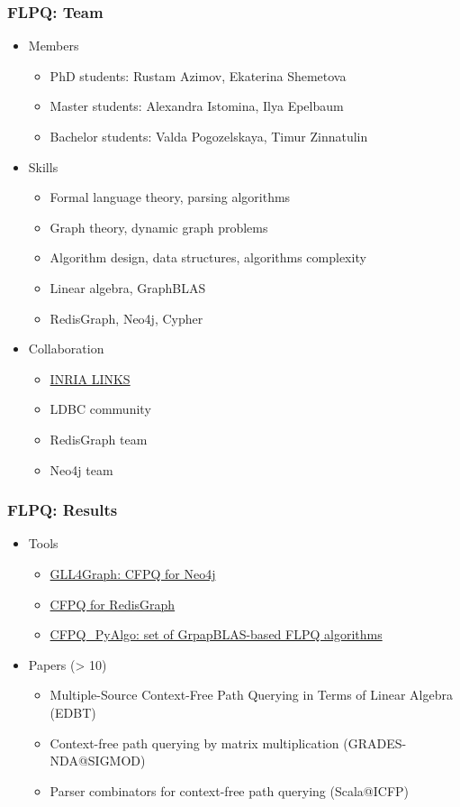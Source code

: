 \documentclass[xcolor=table,aspectratio=169]{beamer}
\begin{document}
\begin{frame}[fragile]
  \frametitle{FLPQ: Team}
  \begin{itemize}
    \item Members 
    \begin{itemize}
      \item PhD students: Rustam Azimov, Ekaterina Shemetova
      \item Master students: Alexandra Istomina, Ilya Epelbaum
      \item Bachelor students: Valda Pogozelskaya, Timur Zinnatulin
    \end{itemize} 
    \item Skills 
    \begin{itemize}
      \item Formal language theory, parsing algorithms
      \item Graph theory, dynamic graph problems
      \item Algorithm design, data structures, algorithms complexity 
      \item Linear algebra, GraphBLAS
      \item RedisGraph, Neo4j, Cypher
    \end{itemize}
    \item Collaboration
    \begin{itemize}
      \item \href{https://team.inria.fr/links/}{INRIA LINKS}
      \item LDBC community
      \item RedisGraph team
      \item Neo4j team
    \end{itemize}
  \end{itemize}
\end{frame}

\begin{frame}[fragile]
  \frametitle{FLPQ: Results}
    \begin{itemize}
      \item Tools
      \begin{itemize}
        \item \href{https://github.com/JetBrains-Research/GLL4Graph}{GLL4Graph: CFPQ for Neo4j}
        \item \href{https://github.com/YaccConstructor/RedisGraph}{CFPQ for RedisGraph}
        \item \href{https://github.com/JetBrains-Research/CFPQ_PyAlgo}{CFPQ\_PyAlgo: set of GrpapBLAS-based FLPQ algorithms}
      \end{itemize}
      \item Papers (> 10)
      \begin{itemize}
        \item Multiple-Source Context-Free Path Querying in Terms of Linear Algebra (EDBT)
        \item Context-free path querying by matrix multiplication (GRADES-NDA@SIGMOD)
        \item Parser combinators for context-free path querying (Scala@ICFP)
      \end{itemize} 
    \end{itemize}
\end{frame}
\end{document}
